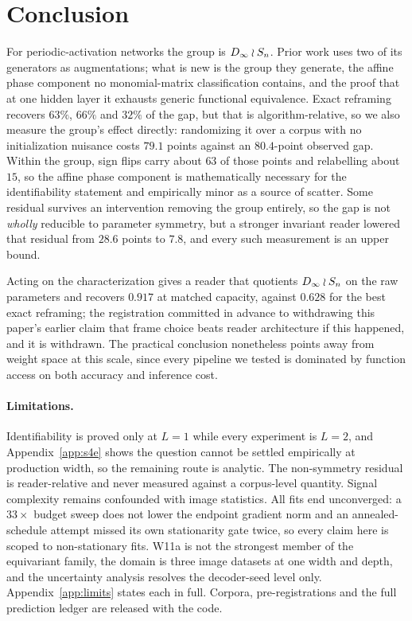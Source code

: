 \section{Conclusion}

For periodic-activation networks the group is $D_\infty\wr S_n$. Prior work uses two of its generators
as augmentations; what is new is the group they generate, the affine phase component no
monomial-matrix classification contains, and the proof that at one hidden layer it exhausts generic
functional equivalence. Exact reframing recovers $63\%$, $66\%$ and $32\%$ of the gap, but that is
algorithm-relative, so we also measure the group's effect directly: randomizing it over a corpus
with no initialization nuisance costs $79.1$ points against an $80.4$-point observed gap. Within the
group, sign flips carry about $63$ of those points and relabelling about $15$, so the affine phase
component is mathematically necessary for the identifiability statement and empirically minor as a
source of scatter. Some residual survives an intervention removing the group entirely, so the gap is
not \emph{wholly} reducible to parameter symmetry, but a stronger invariant reader lowered that
residual from $28.6$ points to $7.8$, and every such measurement is an upper bound.

Acting on the characterization gives a reader that quotients $D_\infty\wr S_n$ on the raw parameters
and recovers $0.917$ at matched capacity, against $0.628$ for the best exact reframing; the
registration committed in advance to withdrawing this paper's earlier claim that frame choice beats
reader architecture if this happened, and it is withdrawn. The practical conclusion nonetheless
points away from weight space at this scale, since every pipeline we tested is dominated by function
access on both accuracy and inference cost.

\paragraph{Limitations.} Identifiability is proved only at $L=1$ while every experiment is $L=2$,
and Appendix~\ref{app:s4e} shows the question cannot be settled empirically at production width, so
the remaining route is analytic. The non-symmetry residual is reader-relative and never measured
against a corpus-level quantity. Signal complexity remains confounded with image statistics. All
fits end unconverged: a $33\times$ budget sweep does not lower the endpoint gradient norm and an
annealed-schedule attempt missed its own stationarity gate twice, so every claim here is scoped to
non-stationary fits. W11a is not the strongest member of the equivariant family, the domain is three
image datasets at one width and depth, and the uncertainty analysis resolves the decoder-seed level
only. Appendix~\ref{app:limits} states each in full. Corpora, pre-registrations and the full
prediction ledger are released with the code.
